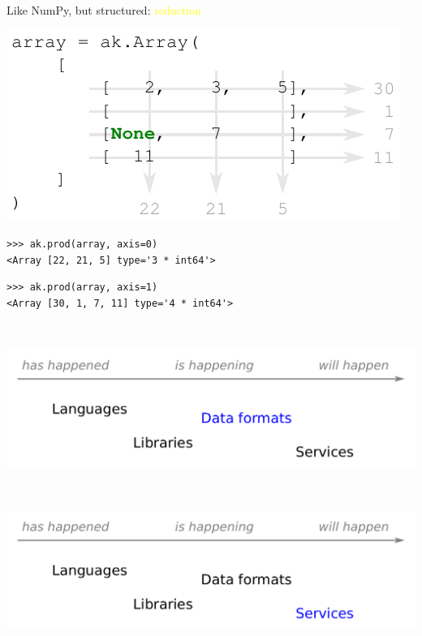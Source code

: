 \documentclass[aspectratio=169]{beamer}
\begin{document}
\begin{frame}[fragile]{Like NumPy, but structured: \textcolor{yellow}{reduction}}
\vspace{0.5 cm}

\includegraphics[width=8 cm]{img/reduction.pdf}

\begin{verbatim}
>>> ak.prod(array, axis=0)
<Array [22, 21, 5] type='3 * int64'>
\end{verbatim}

\begin{verbatim}
>>> ak.prod(array, axis=1)
<Array [30, 1, 7, 11] type='4 * int64'>
\end{verbatim}
\end{frame}



\begin{frame}{\mbox{ }}
\vspace{0.5 cm}

\begin{center}
\includegraphics[width=0.9\linewidth]{img/topics-3.pdf}
\end{center}
\end{frame}

\begin{frame}{\mbox{ }}
\vspace{0.5 cm}

\begin{center}
\includegraphics[width=0.9\linewidth]{img/topics-4.pdf}
\end{center}
\end{frame}
\end{document}
